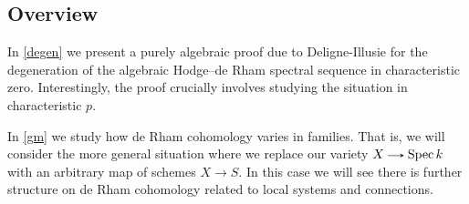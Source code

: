 \subsection{Overview}

In \cref{degen} we present a purely algebraic proof due to Deligne-Illusie for the degeneration of the algebraic Hodge--de Rham spectral sequence in characteristic zero. Interestingly, the proof crucially involves studying the situation in characteristic $p$.

In \cref{gm} we study how de Rham cohomology varies in families. That is, we will consider the more general situation where we replace our variety $X \to \Spec k$ with an arbitrary map of schemes $X \to S$. In this case we will see there is further structure on de Rham cohomology related to local systems and connections.


